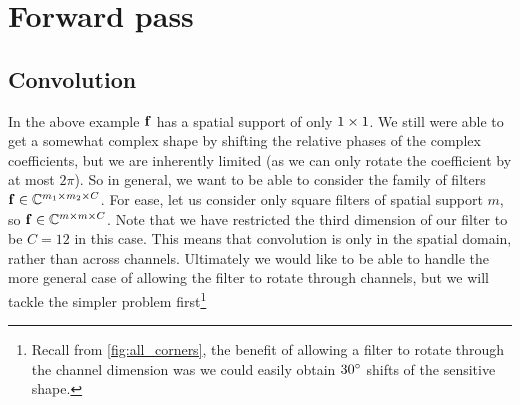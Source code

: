 \section{Forward pass}
\subsection{Convolution}
\newcommand{\SigIn}{z}
\newcommand{\SigOut}{w}
\newcommand{\Filter}{f}
\newcommand{\SigInB}{\bmu{\SigIn}}
\newcommand{\SigOutB}{\bmu{\SigOut}}
\newcommand{\FilterB}{\bmu{\Filter}}
  
In the above example $\FilterB$ has a spatial support of only $1\times 1$. We still
were able to get a somewhat complex shape by shifting the relative phases of
the complex coefficients, but we are inherently limited (as we can only
rotate the coefficient by at most $2\pi$). So in general, we want to be able
to consider the family of filters $\FilterB \in \complexes[m_1 \x m_2 \x C]$. For
ease, let us consider only square filters of spatial support $m$, so
$\FilterB \in \complexes[m\x m\x C]$. Note that we have restricted the third
dimension of our filter to be $C=12$ in this case. This means that convolution is
only in the spatial domain, rather than across channels. Ultimately we would
like to be able to handle the more general case of allowing the filter to
rotate through channels, but we will tackle the simpler problem 
first\footnote{Recall from \autoref{fig:all_corners}, the benefit of allowing
a filter to rotate through the channel dimension was we could easily obtain
$30^{\circ}$ shifts of the sensitive shape.}

